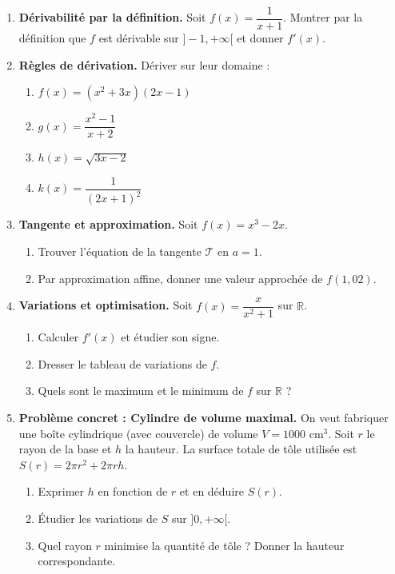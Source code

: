 \documentclass[11pt]{article}
\begin{document}
\begin{exercice}
\begin{enumerate}
\item \textbf{Dérivabilité par la définition.} Soit $f(x) = \dfrac{1}{x+1}$. Montrer par la définition que $f$ est dérivable sur $]-1, +\infty[$ et donner $f'(x)$.
\item \textbf{Règles de dérivation.} Dériver sur leur domaine :
\begin{enumerate}
\item $f(x) = (x^2+3x)(2x-1)$
\item $g(x) = \dfrac{x^2-1}{x+2}$
\item $h(x) = \sqrt{3x-2}$
\item $k(x) = \dfrac{1}{(2x+1)^2}$
\end{enumerate}
\item \textbf{Tangente et approximation.} Soit $f(x) = x^3 - 2x$.
\begin{enumerate}
\item Trouver l'équation de la tangente $\mathcal{T}$ en $a=1$.
\item Par approximation affine, donner une valeur approchée de $f(1,02)$.
\end{enumerate}
\item \textbf{Variations et optimisation.} Soit $f(x) = \dfrac{x}{x^2+1}$ sur $\mathbb{R}$.
\begin{enumerate}
\item Calculer $f'(x)$ et étudier son signe.
\item Dresser le tableau de variations de $f$.
\item Quels sont le maximum et le minimum de $f$ sur $\mathbb{R}$ ?
\end{enumerate}
\item \textbf{Problème concret : Cylindre de volume maximal.} On veut fabriquer une boîte cylindrique (avec couvercle) de volume $V = 1000$ cm$^3$. Soit $r$ le rayon de la base et $h$ la hauteur. La surface totale de tôle utilisée est $S(r) = 2\pi r^2 + 2\pi r h$.
\begin{enumerate}
\item Exprimer $h$ en fonction de $r$ et en déduire $S(r)$.
\item Étudier les variations de $S$ sur $]0, +\infty[$.
\item Quel rayon $r$ minimise la quantité de tôle ? Donner la hauteur correspondante.
\end{enumerate}
\end{enumerate}
\end{exercice}
\end{document}

